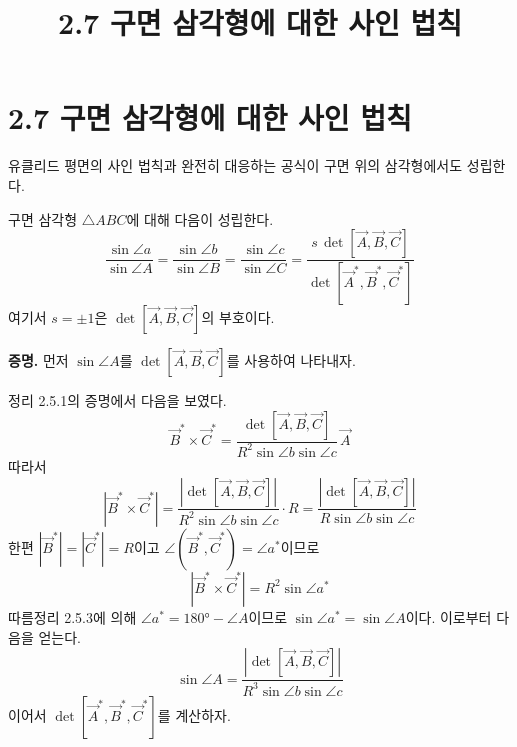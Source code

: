 \documentclass{article}
\title{2.7 구면 삼각형에 대한 사인 법칙}
\date{}
\author{}
\begin{document}
\maketitle

\section*{2.7 구면 삼각형에 대한 사인 법칙}

유클리드 평면의 사인 법칙과 완전히 대응하는 공식이 구면 위의 삼각형에서도 성립한다.

\begin{tcolorbox}[
  colback=red!4, colframe=red!60!black,
  title=정리 2.7.1 (구면 사인 법칙),
  fonttitle=\bfseries, boxrule=0.5mm, arc=3mm]

구면 삼각형 $\triangle ABC$에 대해 다음이 성립한다.
\[
  \frac{\sin\angle a}{\sin\angle A}
  = \frac{\sin\angle b}{\sin\angle B}
  = \frac{\sin\angle c}{\sin\angle C}
  = \frac{s\,\det[\vec{A},\vec{B},\vec{C}]}{\det[\vec{A}^*,\vec{B}^*,\vec{C}^*]}
\]
여기서 $s = \pm 1$은 $\det[\vec{A},\vec{B},\vec{C}]$의 부호이다.

\end{tcolorbox}

\textbf{증명.}\quad
먼저 $\sin\angle A$를 $\det[\vec{A},\vec{B},\vec{C}]$를 사용하여 나타내자.

정리 2.5.1의 증명에서 다음을 보였다.
\[
  \vec{B}^*\times\vec{C}^*
  = \frac{\det[\vec{A},\vec{B},\vec{C}]}{R^2\sin\angle b\sin\angle c}\,\vec{A}
\]
따라서
\[
  |\vec{B}^*\times\vec{C}^*|
  = \frac{|\det[\vec{A},\vec{B},\vec{C}]|}{R^2\sin\angle b\sin\angle c}\cdot R
  = \frac{|\det[\vec{A},\vec{B},\vec{C}]|}{R\sin\angle b\sin\angle c}
\]
한편 $|\vec{B}^*| = |\vec{C}^*| = R$이고 $\angle(\vec{B}^*,\vec{C}^*) = \angle a^*$이므로
\[
  |\vec{B}^*\times\vec{C}^*| = R^2\sin\angle a^*
\]
따름정리 2.5.3에 의해 $\angle a^* = 180° - \angle A$이므로 $\sin\angle a^* = \sin\angle A$이다.
이로부터 다음을 얻는다.
\[
  \sin\angle A = \frac{|\det[\vec{A},\vec{B},\vec{C}]|}{R^3\sin\angle b\sin\angle c}
\]
이어서 $\det[\vec{A}^*,\vec{B}^*,\vec{C}^*]$를 계산하자.
\end{document}
